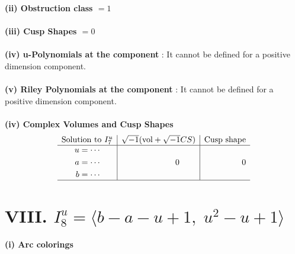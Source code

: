 \documentclass[1p]{elsarticle_modified}
\theoremstyle{definition}
\newcommand{\I}{\sqrt{-1}}
\begin{document}
\flushleft \textbf{(ii) Obstruction class $= 1$}\\~\\
\flushleft \textbf{(iii) Cusp Shapes $= 0$}\\~\\
\flushleft \textbf{(iv) u-Polynomials at the component} : It cannot be defined for a positive dimension component.\\~\\
\flushleft \textbf{(v) Riley Polynomials at the component} : It cannot be defined for a positive dimension component.\\~\\
\newpage\flushleft \textbf{(iv) Complex Volumes and Cusp Shapes}
$$\begin{array}{c|c|c} 
\text{Solution to }I^u_{7}& \I (\text{vol} + \sqrt{-1}CS) & \text{Cusp shape}\\
 \hline 
\begin{aligned}
u &= \cdots \\
a &= \cdots \\
b &= \cdots\end{aligned}
 & \phantom{-0.000000 } 0 & \phantom{-0.000000 } 0\\
 \hline 
 \end{array}
$$\newpage\renewcommand{\arraystretch}{1}
\centering \section*{VIII. $I^u_{8}= \langle b- a- u+1,\;u^2- u+1 \rangle$}
\flushleft \textbf{(i) Arc colorings}\\
\end{document}
